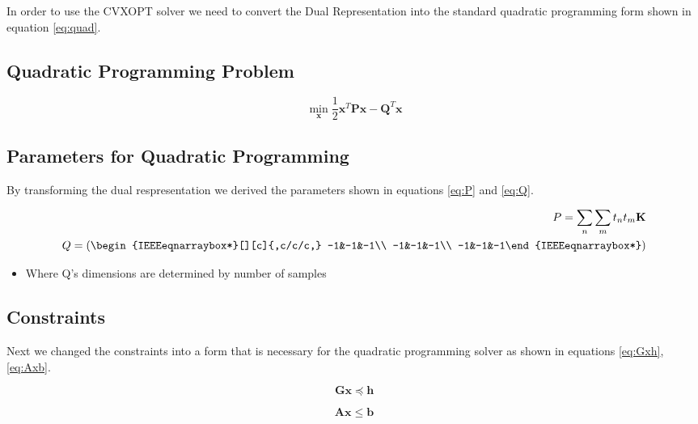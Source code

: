 \documentclass[journal]{IEEEtran}
\begin{document}
    In order to use the CVXOPT solver we need to convert the Dual Representation into the standard quadratic programming form shown in equation \ref{eq:quad}.

    \subsection{Quadratic Programming Problem \cite{QuadraticCVXOPT}}
    \begin{equation}
    \label{eq:quad}
    \min_{\mathbf{x}} \frac{1}{2}\mathbf{x}^T\mathbf{P}\mathbf{x} - \mathbf{Q}^T\mathbf{x}
    \end{equation}

    \subsection{Parameters for Quadratic Programming}

    By transforming the dual respresentation we derived the parameters shown in equations \ref{eq:P} and \ref{eq:Q}.

    \begin{eqnarray}
    \label{eq:P}
    P = \sum\limits_{n} \sum\limits_{m} t_n t_m \mathbf{K}\\
    \label{eq:Q}
    Q = \left(\begin{IEEEeqnarraybox*}[][c]{,c/c/c,}
    -1&-1&-1\\
    -1&-1&-1\\
    -1&-1&-1%
    \end{IEEEeqnarraybox*}\right)
    \end{eqnarray}
    \begin{itemize}
    \item Where Q's dimensions are determined by number of samples
    \end{itemize}

    \subsection{Constraints}

    Next we changed the constraints into a form that is necessary for the quadratic programming solver as shown in equations \ref{eq:Gxh}, \ref{eq:Axb}.

    \begin{equation}
    \label{eq:Gxh}
    \mathbf{G} \mathbf{x} \preceq \mathbf{h}
    \end{equation}

    \begin{equation}
    \label{eq:Axb}
    \mathbf{A} \mathbf{x} \leq \mathbf{b}
    \end{equation}
\end{document}
